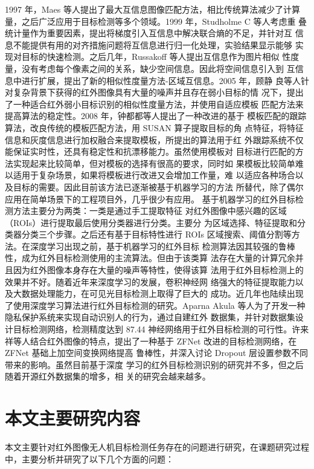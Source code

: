 1997 年，Maes 等人提出了最大互信息图像匹配方法，相比传统算法减少了计算
量，之后广泛应用于目标检测等多个领域\cite{maes1997multimodality}。1999 年，Studholme C 等人考虑重
叠统计量作为重要因素，提出将梯度引入互信息中解决联合熵的不足，并针对互
信息不能提供有用的对齐措施问题将互信息进行归一化处理，实验结果显示能够
实现对目标的快速检测\cite{studholme1999overlap}。之后几年，Russakoff 等人提出互信息作为图片相似
性度量，没有考虑每个像素之间的关系，缺少空间信息。因此将空间信息引入到
互信息中进行扩展，提出了新的相似性度量方法-区域互信息\cite{russakoff2004image}。2005 年，顾静
良等人针对复杂背景下获得的红外图像具有大量的噪声并且存在弱小目标的情
况下，提出了一种适合红外弱小目标识别的相似性度量方法，并使用自适应模板
匹配方法来提高算法的稳定性\cite{顾静良2005基于自适应模板匹配的红外弱小目标检测}。2008 年，钟都都等人提出了一种改进的基于
模板匹配的跟踪算法，改良传统的模板匹配方法，用 SUSAN 算子提取目标的角
点特征，将特征信息和灰度信息进行加权融合来提取模板，所提出的算法用于红
外跟踪系统不仅能保证实时性，还具有稳定性和抗漂移能力\cite{钟都都2008用于红外目标跟踪的模板匹配改进算法}。虽然使用模板对
目标进行匹配的方法实现起来比较简单，但对模板的选择有很高的要求，同时如
果模板比较简单难以适用于复杂场景，如果将模板进行改进又会增加工作量，难
以适应各种场合以及目标的需要。因此目前该方法已逐渐被基于机器学习的方法
所替代，除了偶尔应用在简单场景下的工程项目外，几乎很少有应用。
基于机器学习的红外目标检测方法主要分为两类：一类是通过手工提取特征
对红外图像中感兴趣的区域（ROIs）进行提取最后使用分类器进行分类。主要分
为区域选择、特征提取和分类器分类三个步骤。之后还有基于目标特性进行 ROIs
区域搜索、阈值分割等方法\cite{徐小婷2019基于深度学习的红外场景目标检测技术研究}。在深度学习出现之前，基于机器学习的红外目标
检测算法因其较强的鲁棒性，成为红外目标检测使用的主流算法。但由于该类算
法存在大量的计算冗余并且因为红外图像本身存在大量的噪声等特性，使得该算
法用于红外目标检测上的效果并不好。随着近年来深度学习的发展，卷积神经网
络强大的特征提取能力以及大数据处理能力，在可见光目标检测上取得了巨大的
成功。近几年也陆续出现了使用深度学习算法进行红外目标检测的研究。Aparna
Akula 等人为了开发一种隐私保护系统来实现自动识别人的行为，通过自建红外
数据集，并针对数据集设计目标检测网络，检测精度达到 87.44%
神经网络用于红外目标检测的可行性\cite{akula2018deep}。许来祥等人结合红外图像的特点，提出了一种基于 ZFNet 改进的目标检测网络，在 ZFNet 基础上加空间变换网络提高
鲁棒性，并深入讨论 Dropout 层设置参数不同带来的影响\cite{许来祥2020基于改进}。虽然目前基于深度
学习的红外目标检测识别的研究并不多，但之后随着开源红外数据集的增多，相
关的研究会越来越多。

\section{本文主要研究内容}
本文主要针对红外图像无人机目标检测任务存在的问题进行研究，在课题研究过程中，主要分析并研究了以下几个方面的问题：

